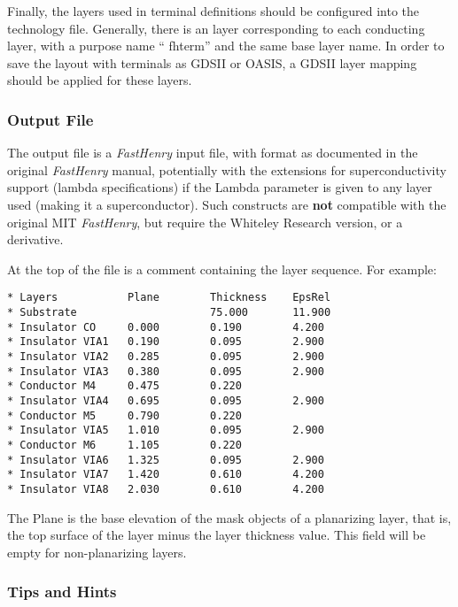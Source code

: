Finally, the layers used in terminal definitions should be configured
into the technology file.  Generally, there is an {\Xic} layer
corresponding to each conducting layer, with a purpose name ``{\vt
fhterm}'' and the same base layer name.  In order to save the layout
with terminals as GDSII or OASIS, a GDSII layer mapping should be
applied for these layers.

\subsubsection{Output File}

The output file is a {\it FastHenry} input file, with format as
documented in the original {\it FastHenry} manual, potentially with
the extensions for superconductivity support ({\vt lambda}
specifications) if the {\et Lambda} parameter is given to any layer
used (making it a superconductor).  Such constructs are {\bf not}
compatible with the original MIT {\it FastHenry}, but require the
Whiteley Research version, or a derivative.

At the top of the file is a comment containing the layer sequence. 
For example:

\begin{verbatim}
* Layers           Plane        Thickness    EpsRel
* Substrate                     75.000       11.900
* Insulator CO     0.000        0.190        4.200
* Insulator VIA1   0.190        0.095        2.900
* Insulator VIA2   0.285        0.095        2.900
* Insulator VIA3   0.380        0.095        2.900
* Conductor M4     0.475        0.220
* Insulator VIA4   0.695        0.095        2.900
* Conductor M5     0.790        0.220
* Insulator VIA5   1.010        0.095        2.900
* Conductor M6     1.105        0.220
* Insulator VIA6   1.325        0.095        2.900
* Insulator VIA7   1.420        0.610        4.200
* Insulator VIA8   2.030        0.610        4.200
\end{verbatim}

The {\vt Plane} is the base elevation of the mask objects of a
planarizing layer, that is, the top surface of the layer minus the
layer thickness value.  This field will be empty for non-planarizing
layers.

\subsubsection{Tips and Hints}

